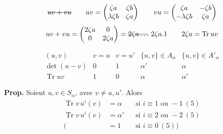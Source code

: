 \documentclass[11pt,a4paper]{article}
\begin{document}
\[
\text{\struck{$uv + vu$}} \qquad
u v = \begin{pmatrix} \zeta a & \zeta b \\ \lambda\zeta b & \zeta a \end{pmatrix}
\qquad
v u = \begin{pmatrix} \zeta a & -\zeta b \\ -\lambda\zeta b & \zeta a \end{pmatrix}
\]
\[
uv + vu = \begin{pmatrix} 2\zeta a & 0 \\ 0 & 2\zeta a \end{pmatrix}
= \text{\struck{$2\zeta a \ldots$}}\ 2\zeta a . 1
\qquad 2\zeta a = \operatorname{Tr} u v
\]

\[
\begin{array}{c|c|c|c|c}
(u, v) & v = u & v = u' & \{u, v\} \in A_\alpha & \{u, v\} \in A'_\alpha \\ \hline
\det(u - v) & 0 & 1 & \alpha' & \alpha \\ \hline
\operatorname{Tr} u v & 1 & 0 & \alpha & \alpha'
\end{array}
\]

\textbf{Prop.} Soient $u, v \in S_\alpha$, avec $v \neq u, u'$. Alors
\[
\begin{aligned}
\operatorname{Tr} v\, u^i(v) &= \alpha & &\text{si } i \equiv 1 \text{ ou } -1 \ (5) \\
\operatorname{Tr} v\, u^i(v) &= \alpha' & &\text{si } i \equiv 2 \text{ ou } -2 \ (5) \\
(&= 1 & &\text{si } i \equiv 0 \ (5))
\end{aligned}
\]

\end{document}
